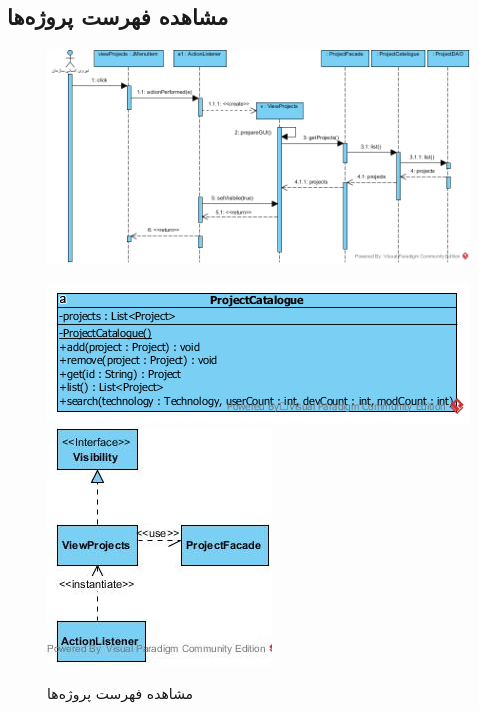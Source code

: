 \begin{landscape}
\newpage
\section{مشاهده فهرست پروژه‌ها}
\begin{figure}[H]
	\centering
	\includegraphics[scale=0.8]{img/sequence-design/ViewListOfProjects}
\end{figure}
\begin{figure}[H]
	\centering
	\includegraphics[scale=0.9]{img/sequence-design/ViewListOfProjectsC}
	\includegraphics[scale=0.9]{img/sequence-design/ViewListOfProjectsUI}
	\caption{مشاهده فهرست پروژه‌ها}
\end{figure}


\newpage

\end{landscape}
